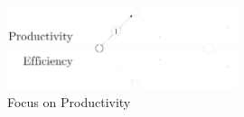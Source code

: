\begin{figure}[!h]
\begin{center}
\includegraphics[width=0.6\textwidth]{../ressources/state-of-the-art-1.pdf}
\end{center}
\caption{Focus on Productivity}
\label{fig:state-of-the-art-1}
\end{figure}







